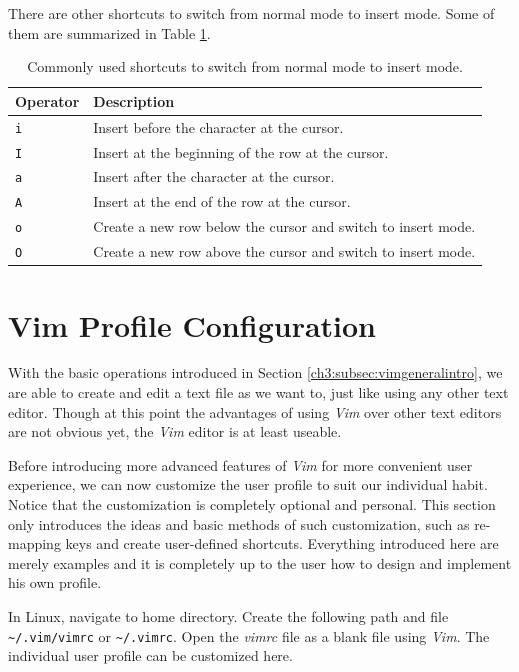 There are other shortcuts to switch from normal mode to insert mode. Some of them are summarized in Table \ref{ch3tab:switchtoinsert}.

\begin{table}
  \centering \caption{Commonly used shortcuts to switch from normal mode to insert mode.}\label{ch3tab:switchtoinsert}
  \begin{tabularx}{\textwidth}{lX}
    \hline
    Operator & Description \\ \hline
    \verb|i| & Insert before the character at the cursor. \\ \hdashline
    \verb|I| & Insert at the beginning of the row at the cursor. \\ \hdashline
    \verb|a| & Insert after the character at the cursor. \\ \hdashline
    \verb|A| & Insert at the end of the row at the cursor. \\ \hdashline
    \verb|o| & Create a new row below the cursor and switch to insert mode. \\ \hdashline
    \verb|O| & Create a new row above the cursor and switch to insert mode. \\
    \hline
  \end{tabularx}
\end{table}

\section{Vim Profile Configuration}

With the basic operations introduced in Section \ref{ch3:subsec:vimgeneralintro}, we are able to create and edit a text file as we want to, just like using any other text editor. Though at this point the advantages of using \textit{Vim} over other text editors are not obvious yet, the \textit{Vim} editor is at least useable.

Before introducing more advanced features of \textit{Vim} for more convenient user experience, we can now customize the user profile to suit our individual habit. Notice that the customization is completely optional and personal. This section only introduces the ideas and basic methods of such customization, such as re-mapping keys and create user-defined shortcuts. Everything introduced here are merely examples and it is completely up to the user how to design and implement his own profile.

In Linux, navigate to home directory. Create the following path and file \verb|~/.vim/vimrc| or \verb|~/.vimrc|. Open the \textit{vimrc} file as a blank file using \textit{Vim}. The individual user profile can be customized here.


